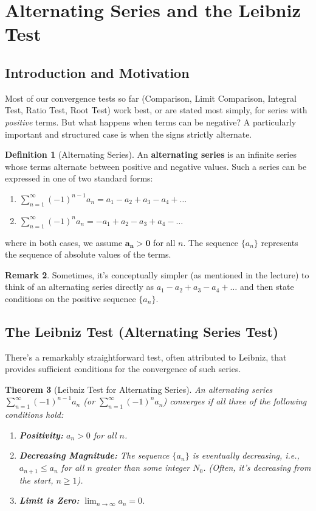 \documentclass[11pt, a4paper]{article}
\theoremstyle{plain} %
\newtheorem{theorem}{Theorem}[section]
\theoremstyle{definition} %
\newtheorem{definition}[theorem]{Definition}
\newtheorem{remark}[theorem]{Remark}
\begin{document}
\section{Alternating Series and the Leibniz Test}

\subsection{Introduction and Motivation}
Most of our convergence tests so far (Comparison, Limit Comparison, Integral Test, Ratio Test, Root Test) work best, or are stated most simply, for series with \textit{positive} terms. But what happens when terms can be negative? A particularly important and structured case is when the signs strictly alternate.

\begin{definition}[Alternating Series]
An \textbf{alternating series} is an infinite series whose terms alternate between positive and negative values. Such a series can be expressed in one of two standard forms:
\begin{enumerate}
    \item $\sum_{n=1}^{\infty} (-1)^{n-1} a_n = a_1 - a_2 + a_3 - a_4 + \dots$
    \item $\sum_{n=1}^{\infty} (-1)^{n} a_n = -a_1 + a_2 - a_3 + a_4 - \dots$
\end{enumerate}
where in both cases, we assume $\boldsymbol{a_n > 0}$ for all $n$. The sequence $\{a_n\}$ represents the sequence of absolute values of the terms.
\end{definition}

\begin{remark}
Sometimes, it's conceptually simpler (as mentioned in the lecture) to think of an alternating series directly as $a_1 - a_2 + a_3 - a_4 + \dots$ and then state conditions on the positive sequence $\{a_n\}$.
\end{remark}

\subsection{The Leibniz Test (Alternating Series Test)}
There's a remarkably straightforward test, often attributed to Leibniz, that provides sufficient conditions for the convergence of such series.

\begin{theorem}[Leibniz Test for Alternating Series]\label{thm:leibniz} %
An alternating series $\sum_{n=1}^{\infty} (-1)^{n-1} a_n$ (or $\sum_{n=1}^{\infty} (-1)^{n} a_n$) converges if all three of the following conditions hold:
\begin{enumerate}
    \item \textbf{Positivity:} $a_n > 0$ for all $n$.
    \item \textbf{Decreasing Magnitude:} The sequence $\{a_n\}$ is eventually decreasing, i.e., $a_{n+1} \le a_n$ for all $n$ greater than some integer $N_0$. (Often, it's decreasing from the start, $n \ge 1$).
    \item \textbf{Limit is Zero:} $\lim_{n \to \infty} a_n = 0$.
\end{enumerate}
\end{theorem}
\end{document}
